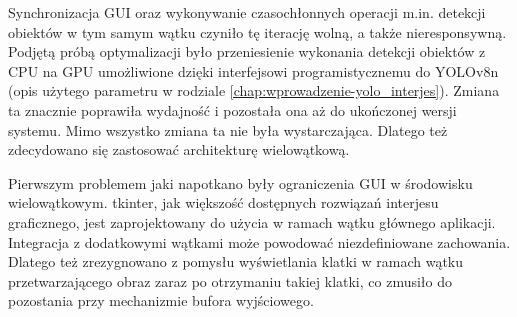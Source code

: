 Synchronizacja GUI oraz wykonywanie czasochłonnych operacji m.in. detekcji obiektów w tym samym wątku czyniło tę iterację wolną, a także nieresponsywną. Podjętą próbą optymalizacji było przeniesienie wykonania detekcji obiektów z CPU na GPU umożliwione dzięki interfejsowi programistycznemu do YOLOv8n (opis użytego parametru w rodziale \ref{chap:wprowadzenie-yolo_interjes}). Zmiana ta znacznie poprawiła wydajność i pozostała ona aż do ukończonej wersji systemu. Mimo wszystko zmiana ta nie była wystarczająca. Dlatego też zdecydowano się zastosować architekturę wielowątkową. 

Pierwszym problemem jaki napotkano były ograniczenia  GUI w środowisku wielowątkowym. tkinter, jak większość dostępnych rozwiązań interjesu graficznego, jest zaprojektowany do użycia w ramach wątku głównego aplikacji. Integracja z dodatkowymi wątkami może powodować niezdefiniowane zachowania. Dlatego też zrezygnowano z pomysłu wyświetlania klatki w ramach wątku przetwarzającego obraz zaraz po otrzymaniu takiej klatki, co zmusiło do pozostania przy mechanizmie bufora wyjściowego. 

